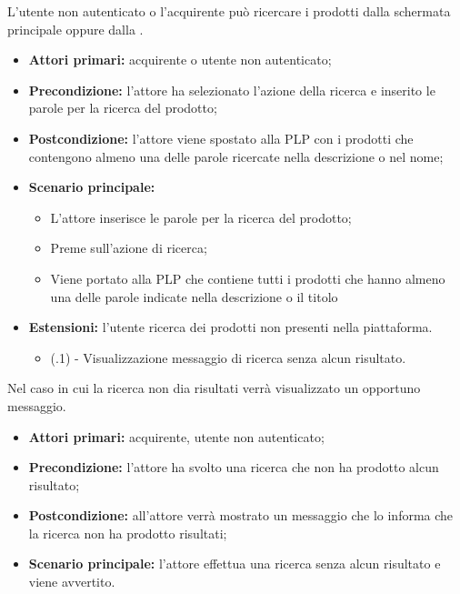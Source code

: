 L'utente non autenticato o l'acquirente può ricercare i prodotti dalla schermata principale oppure dalla .
\begin{itemize}
    \item \textbf{Attori primari:} acquirente o utente non autenticato;
    \item \textbf{Precondizione:} l'attore ha selezionato l'azione della ricerca e inserito le parole per la ricerca del prodotto;
    \item \textbf{Postcondizione:} l'attore viene spostato alla PLP con i prodotti che contengono almeno una delle parole ricercate nella descrizione o nel nome;
    \item \textbf{Scenario principale:} 
    \begin{itemize}
        \item L'attore inserisce le parole per la ricerca del prodotto;
        \item Preme sull'azione di ricerca;
        \item Viene portato alla PLP che contiene tutti i prodotti che hanno almeno una delle parole indicate nella descrizione o il titolo
    \end{itemize}
    \item \textbf{Estensioni:} l'utente ricerca dei prodotti non presenti nella piattaforma.
    \begin{itemize}
    	\item (\actualUC.1) - Visualizzazione messaggio di ricerca senza alcun risultato.
    \end{itemize}
\end{itemize}

\resetSubUC

Nel caso in cui la ricerca non dia risultati verrà visualizzato un opportuno messaggio.
\begin{itemize}
	\item \textbf{Attori primari:} acquirente, utente non autenticato;
	\item \textbf{Precondizione:} l'attore ha svolto una ricerca che non ha prodotto alcun risultato;
	\item \textbf{Postcondizione:} all'attore verrà mostrato un messaggio che lo informa che la ricerca non ha prodotto risultati;
	\item \textbf{Scenario principale:} l'attore effettua una ricerca senza alcun risultato e viene avvertito.
\end{itemize}


